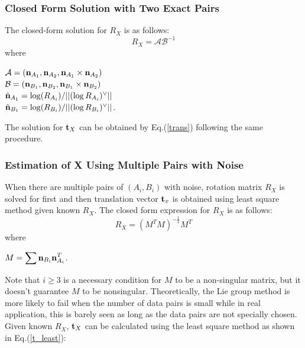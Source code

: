 \documentclass[twocolumn,10pt]{asme2ej}
\newcommand{\nn}{{\bf n}}
\newcommand{\ttt}{{\bf t}}
\begin{document}
\subsubsection{Closed Form Solution with Two Exact Pairs}
The closed-form solution for $R_{X}$ is as follows:
\begin{equation}
R_{X} = \mathcal{A}\mathcal{B}^{-1}
\label{Lie_Rotation}
\end{equation}
where\\

\begin{center}
$\mathcal{A} = (\nn_{A_{1}}, \nn_{A_{2}}, \nn_{A_{1}} \times \nn_{A_{2}})$\\
 $\mathcal{B} = (\nn_{B_{1}}, \nn_{B_{2}}, \nn_{B_{1}} \times \nn_{B_{2}})$\\
$\tilde{\nn}_{A_{1}} = \log(R_{A_{i}})/||(\log R_{A_{i}})^{\vee}||$\\
$\tilde{\nn}_{B_{1}} = \log(R_{B_{i}})/||(\log R_{B_{i}})^{\vee}||$.
\end{center}
The solution for $\ttt_{X}$ can be obtained by Eq.(\ref{trans}) following the same procedure.\\

\subsubsection{Estimation of X Using Multiple Pairs with Noise}
When there are multiple pairs of $(A_{i}, B_{i})$ with noise, rotation matrix $R_{X}$ is solved for first and then translation vector $\ttt_{x}$ is obtained using least square method given known $R_{X}$. The closed form expression for $R_{X}$ is as follows:
\begin{equation}
R_{X} = (M^{T}M)^{-\frac{1}{2}}M^{T}
\end{equation}
where \\
\begin{center}
$M = \mathlarger{\sum{\nn_{B_{i}} \nn_{A_{i}}^{T}}}$.
\end{center}
Note that $i \geq 3$ is a necessary condition for $M$ to be a non-singular matrix, but it doesn't guarantee $M$ to be nonsingular. Theoretically, the Lie group method is more likely to fail when the number of data pairs is small while in real application, this is barely seen as long as the data pairs are not specially chosen. Given known $R_{X}$, $\ttt_{X}$ can be calculated using the least square method as shown in Eq.(\ref{t_least}):
\end{document}
